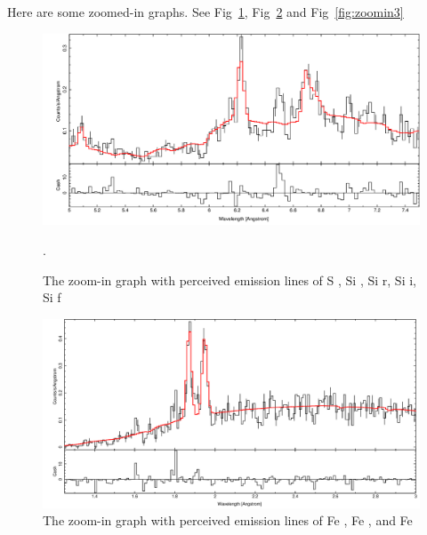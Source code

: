 Here are some zoomed-in graphs. See Fig~\ref{fig:zoomin2}, Fig~\ref{fig:zoomin1} and Fig~\ref{fig:zoomin3}

\begin{figure}[h!]
    \centering
    \includegraphics[width=1\linewidth]{Chapters/Figures/zoomin4.png}
    \caption{The zoom-in graph with perceived emission lines of S {\footnotesize{}}, Si {\footnotesize{}}, Si {\footnotesize{}r}, Si {\footnotesize{}i}, Si {\footnotesize{}f}}.
    \label{fig:zoomin2}
\end{figure}

\begin{figure}[h!]
    \centering
    \includegraphics[width=1\linewidth]{Chapters/Figures/zoomin1.png}
    \caption{The zoom-in graph with perceived emission lines of Fe {\footnotesize{}}, Fe {\footnotesize{}}, and Fe {\footnotesize{}}}
    \label{fig:zoomin1}
\end{figure}


